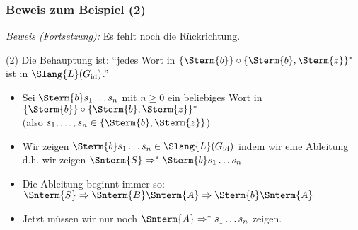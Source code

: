 \documentclass[aspectratio=1610,onlymath]{beamer}
\begin{document}
\begin{frame}\frametitle{Beweis zum Beispiel (2)}

%
\bigskip

\emph{Beweis (Fortsetzung):} Es fehlt noch die Rückrichtung.
\bigskip

(2) Die Behauptung ist: "`jedes Wort in $\{\Sterm{b}\}\circ \{\Sterm{b},\Sterm{z}\}^*$ ist in $\Slang{L}(G_{\text{id}})$."'
\begin{itemize}
\item Sei $\Sterm{b}s_1 \ldots s_n$ mit $n\geq 0$ ein beliebiges Wort in $\{\Sterm{b}\}\circ \{\Sterm{b},\Sterm{z}\}^*$\\ (also $s_1,\ldots,s_n\in \{\Sterm{b},\Sterm{z}\}$)
\item Wir zeigen $\Sterm{b}s_1 \ldots s_n\in \Slang{L}(G_{\text{id}})$ indem wir eine Ableitung \\
d.h. wir zeigen $\Snterm{S} \Rightarrow^* \Sterm{b}s_1 \ldots s_n$
\item Die Ableitung beginnt immer so: $\Snterm{S} \Rightarrow \Snterm{B}\Snterm{A} \Rightarrow \Sterm{b}\Snterm{A}$
\item Jetzt müssen wir nur noch $\Snterm{A}\Rightarrow^* s_1 \ldots s_n$ zeigen. 
\end{itemize}

\end{frame}
\end{document}
